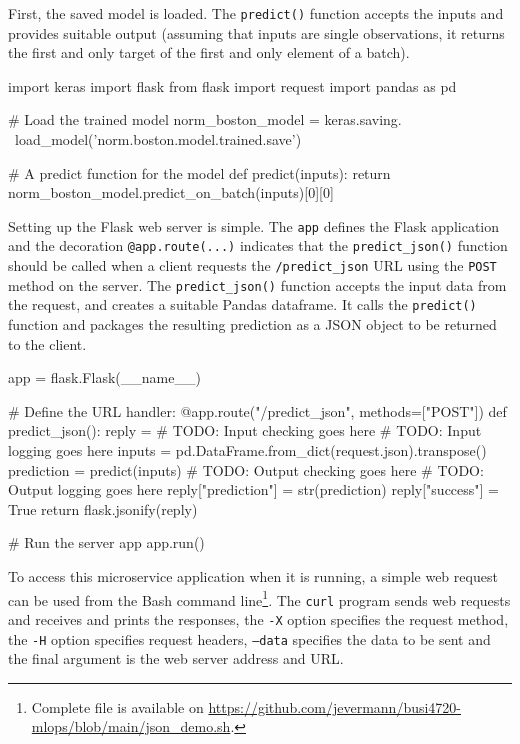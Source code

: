 First, the saved model is loaded. The \texttt{predict()} function accepts the inputs and provides suitable output (assuming that inputs are single observations, it returns the first and only target of the first and only element of a batch).

\begin{samepage}
\begin{pythoncode}
import keras
import flask
from flask import request
import pandas as pd

# Load the trained model
norm_boston_model = keras.saving. \
    load_model('norm.boston.model.trained.save')

# A predict function for the model
def predict(inputs):
    return norm_boston_model.predict_on_batch(inputs)[0][0]
\end{pythoncode}
\end{samepage}

Setting up the Flask web server is simple. The \texttt{app} defines the Flask application and the decoration \texttt{@app.route(...)} indicates that the \texttt{predict\_json()} function should be called when a client requests the \texttt{/predict\_json} URL using the \texttt{POST} method on the server. The \texttt{predict\_json()} function accepts the input data from the request, and creates a suitable Pandas dataframe. It calls the \texttt{predict()} function and packages the resulting prediction as a JSON object to be returned to the client. 

\begin{samepage}
\begin{pythoncode}
app = flask.Flask(__name__)

# Define the URL handler:
@app.route("/predict_json", methods=["POST"])
def predict_json():
    reply = {}
    # TODO: Input checking goes here
    # TODO: Input logging goes here
    inputs = pd.DataFrame.from_dict(request.json).transpose()
    prediction = predict(inputs)
    # TODO: Output checking goes here
    # TODO: Output logging goes here
    reply["prediction"] = str(prediction)
    reply["success"] = True
    return flask.jsonify(reply)

# Run the server app
app.run()
\end{pythoncode}
\end{samepage}

To access this microservice application when it is running, a simple web request can be used from the Bash command line\footnote{Complete file is available on \url{https://github.com/jevermann/busi4720-mlops/blob/main/json_demo.sh}.}. The \texttt{curl} program sends web requests and receives and prints the responses, the \texttt{-X} option specifies the request method, the \texttt{-H} option specifies request headers, \texttt{--data} specifies the data to be sent and the final argument is the web server address and URL. 

